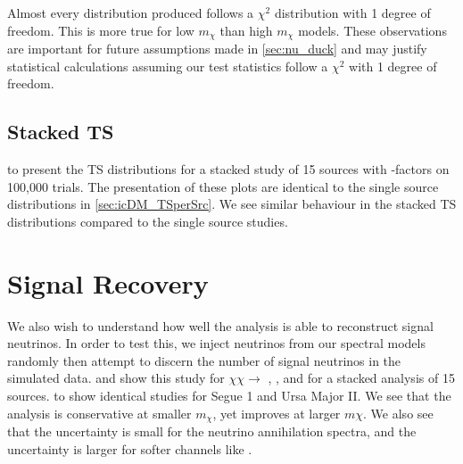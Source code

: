 Almost every distribution produced follows a $\chi^2$ distribution with 1 degree of freedom.
This is more true for low $m_\chi$ than high $m_\chi$ models.
These observations are important for future assumptions made in \cref{sec:nu_duck} and may justify statistical calculations assuming our test statistics follow a $\chi^2$ with 1 degree of freedom.

\subsection{Stacked TS} \label{sec:icDM_TSstacked}


 to  present the TS distributions for a stacked study of 15 sources with \GS \J-factors on 100,000 trials.
The presentation of these plots are identical to the single source distributions in \cref{sec:icDM_TSperSrc}.
We see similar behaviour in the stacked TS distributions compared to the single source studies.

\section{Signal Recovery} \label{sec:icDM_sig_recovery}

We also wish to understand how well the analysis is able to reconstruct signal neutrinos.
In order to test this, we inject neutrinos from our spectral models randomly then attempt to discern the number of signal neutrinos in the simulated data.
 and  show this study for $\chi\chi \rightarrow$ , , and \parpar{\nu_\mu} for a stacked analysis of 15 sources.
 to  show identical studies for Segue 1 and Ursa Major II.
We see that the analysis is conservative at smaller $m_\chi$, yet improves at larger $m\chi$.
We also see that the uncertainty is small for the neutrino annihilation spectra, and the uncertainty is larger for softer channels like .


